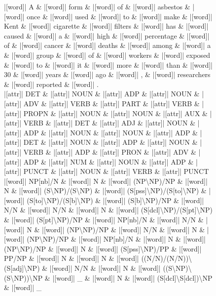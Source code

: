 \documentclass[10pt,a4paper]{article}
\begin{document}
\begin{figure}[h]
{\begin{dependency}[theme = simple]
\begin{deptext}[column sep=1em, row sep=0.1em]
|[word]| A \& |[word]| form \& |[word]| of \& |[word]| asbestos \& |[word]| once \& |[word]| used \& |[word]| to \& |[word]| make \& |[word]| Kent \& |[word]| cigarette \& |[word]| filters \& |[word]| has \& |[word]| caused \& |[word]| a \& |[word]| high \& |[word]| percentage \& |[word]| of \& |[word]| cancer \& |[word]| deaths \& |[word]| among \& |[word]| a \& |[word]| group \& |[word]| of \& |[word]| workers \& |[word]| exposed \& |[word]| to \& |[word]| it \& |[word]| more \& |[word]| than \& |[word]| 30 \& |[word]| years \& |[word]| ago \& |[word]| , \& |[word]| researchers \& |[word]| reported \& |[word]| . \\
|[attr]| DET \& |[attr]| NOUN \& |[attr]| ADP \& |[attr]| NOUN \& |[attr]| ADV \& |[attr]| VERB \& |[attr]| PART \& |[attr]| VERB \& |[attr]| PROPN \& |[attr]| NOUN \& |[attr]| NOUN \& |[attr]| AUX \& |[attr]| VERB \& |[attr]| DET \& |[attr]| ADJ \& |[attr]| NOUN \& |[attr]| ADP \& |[attr]| NOUN \& |[attr]| NOUN \& |[attr]| ADP \& |[attr]| DET \& |[attr]| NOUN \& |[attr]| ADP \& |[attr]| NOUN \& |[attr]| VERB \& |[attr]| ADP \& |[attr]| PRON \& |[attr]| ADV \& |[attr]| ADP \& |[attr]| NUM \& |[attr]| NOUN \& |[attr]| ADP \& |[attr]| PUNCT \& |[attr]| NOUN \& |[attr]| VERB \& |[attr]| PUNCT \\
|[word]| NP{[}nb{]}/N \& |[word]| N \& |[word]| (NP\textbackslash{}NP)/NP \& |[word]| N \& |[word]| (S\textbackslash{}NP)/(S\textbackslash{}NP) \& |[word]| (S{[}pss{]}\textbackslash{}NP)/(S{[}to{]}\textbackslash{}NP) \& |[word]| (S{[}to{]}\textbackslash{}NP)/(S{[}b{]}\textbackslash{}NP) \& |[word]| (S{[}b{]}\textbackslash{}NP)/NP \& |[word]| N/N \& |[word]| N/N \& |[word]| N \& |[word]| (S{[}dcl{]}\textbackslash{}NP)/(S{[}pt{]}\textbackslash{}NP) \& |[word]| (S{[}pt{]}\textbackslash{}NP)/NP \& |[word]| NP{[}nb{]}/N \& |[word]| N/N \& |[word]| N \& |[word]| (NP\textbackslash{}NP)/NP \& |[word]| N/N \& |[word]| N \& |[word]| (NP\textbackslash{}NP)/NP \& |[word]| NP{[}nb{]}/N \& |[word]| N \& |[word]| (NP\textbackslash{}NP)/NP \& |[word]| N \& |[word]| (S{[}pss{]}\textbackslash{}NP)/PP \& |[word]| PP/NP \& |[word]| N \& |[word]| N \& |[word]| ((N/N)/(N/N))\textbackslash{}(S{[}adj{]}\textbackslash{}NP) \& |[word]| N/N \& |[word]| N \& |[word]| ((S\textbackslash{}NP)\textbackslash{}(S\textbackslash{}NP))\textbackslash{}NP \& |[word]| \_ \& |[word]| N \& |[word]| (S{[}dcl{]}\textbackslash{}S{[}dcl{]})\textbackslash{}NP \& |[word]| \_ \\
\end{deptext}


\end{dependency}}
\end{figure}
\end{document}
